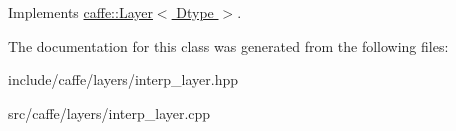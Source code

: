 Implements \hyperlink{classcaffe_1_1Layer_ad9d391b972c769c0ebee34ca6d1c973e}{caffe\+::\+Layer$<$ Dtype $>$}.



The documentation for this class was generated from the following files\+:\begin{DoxyCompactItemize}
\item 
include/caffe/layers/interp\+\_\+layer.\+hpp\item 
src/caffe/layers/interp\+\_\+layer.\+cpp\end{DoxyCompactItemize}

